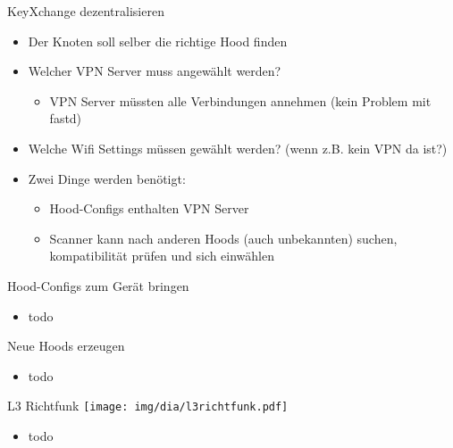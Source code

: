 \begin{frame}{KeyXchange dezentralisieren}
    \begin{itemize}
        \item Der Knoten soll selber die richtige Hood finden
        \item Welcher VPN Server muss angewählt werden?
        \begin{itemize}
            \item VPN Server müssten alle Verbindungen annehmen (kein
                Problem mit fastd)
        \end{itemize}
        \item Welche Wifi Settings müssen gewählt werden? (wenn z.B.
            kein VPN da ist?)
        \item Zwei Dinge werden benötigt: 
        \begin{itemize}
            \item Hood-Configs enthalten VPN Server
            \item Scanner kann nach anderen Hoods (auch unbekannten)
                suchen, kompatibilität prüfen und sich einwählen
        \end{itemize}
    \end{itemize}
\end{frame}

\begin{frame}{Hood-Configs zum Gerät bringen}
    \begin{itemize}
        \item todo
    \end{itemize}
\end{frame}

\begin{frame}{Neue Hoods erzeugen}
    \begin{itemize}
        \item todo
    \end{itemize}
\end{frame}

\begin{frame}{L3 Richtfunk}
    \texttt{[image: img/dia/l3richtfunk.pdf]}
    \begin{itemize}
        \item todo
    \end{itemize}
\end{frame}

